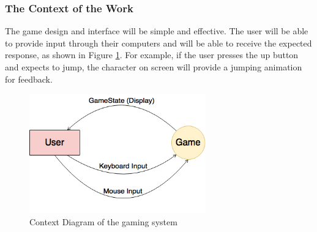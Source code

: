 \documentclass[12pt, titlepage]{article}
\begin{document}
\subsubsection{The Context of the Work}
The game design and interface will be simple and effective. The user will be able to provide input through their computers and will be able to receive the expected response, as shown in Figure \ref{fig:context}. For example, if the user presses the up button and expects to jump, the character on screen will provide a jumping animation for feedback.
\begin{figure}[h] %
   \centering
   \includegraphics[width=3in]{Fig1} 
   \caption{Context Diagram of the gaming system}
   \label{fig:context}
\end{figure}
\end{document}
